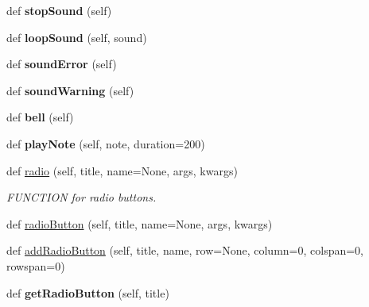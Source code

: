 \begin{DoxyCompactItemize}
def {\bfseries stop\+Sound} (self)
\item 
\mbox{\label{class_python_01_g_u_i_1_1appjar_1_1gui_ac23d976e88c4f6e7849a4bb0d8da29f5}} 
def {\bfseries loop\+Sound} (self, sound)
\item 
\mbox{\label{class_python_01_g_u_i_1_1appjar_1_1gui_af47c32f1e3b28e10134f4f2302d00aa9}} 
def {\bfseries sound\+Error} (self)
\item 
\mbox{\label{class_python_01_g_u_i_1_1appjar_1_1gui_a13933e5dd8a0d418d1c6d06bd57e2484}} 
def {\bfseries sound\+Warning} (self)
\item 
\mbox{\label{class_python_01_g_u_i_1_1appjar_1_1gui_a999bb94ae20ec7e6cbe671032fcbd163}} 
def {\bfseries bell} (self)
\item 
\mbox{\label{class_python_01_g_u_i_1_1appjar_1_1gui_acc193fc3209c5c6a1f340ea8e3a1e526}} 
def {\bfseries play\+Note} (self, note, duration=200)
\item 
def \hyperlink{class_python_01_g_u_i_1_1appjar_1_1gui_a52874b3cff3bee7fc67bf50266023dbd}{radio} (self, title, name=None, args, kwargs)
\begin{DoxyCompactList}\small\item\em F\+U\+N\+C\+T\+I\+ON for radio buttons. \end{DoxyCompactList}\item 
def \hyperlink{class_python_01_g_u_i_1_1appjar_1_1gui_aa3c072d4412ccc2f41629185ca0efd4d}{radio\+Button} (self, title, name=None, args, kwargs)
\item 
def \hyperlink{class_python_01_g_u_i_1_1appjar_1_1gui_a3020da53937c4a65832c8cb88df01727}{add\+Radio\+Button} (self, title, name, row=None, column=0, colspan=0, rowspan=0)
\item 
\mbox{\label{class_python_01_g_u_i_1_1appjar_1_1gui_afff0afbe253c863000467c0516934959}} 
def {\bfseries get\+Radio\+Button} (self, title)
\item 
\mbox{\label{class_python_01_g_u_i_1_1appjar_1_1gui_a256dec9a3744f00161b53caad4dac1a3}} 

\end{DoxyCompactItemize}
